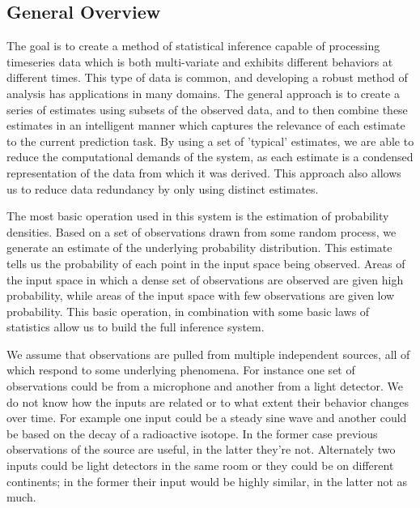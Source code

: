 \documentclass[10pt]{article}
\begin{document}



\subsection{General Overview}
The goal is to create a method of statistical inference capable of processing timeseries data which is both multi-variate and exhibits different behaviors at different times.  This type of data is common, and developing a robust method of analysis has applications in many domains.  The general approach is to create a series of estimates using subsets of the observed data, and to then combine these estimates in an intelligent manner which captures the relevance of each estimate to the current prediction task.  By using a set of 'typical' estimates, we are able to reduce the computational demands of the system, as each estimate is a condensed representation of the data from which it was derived.  This approach also allows us to reduce data redundancy by only using distinct estimates.

The most basic operation used in this system is the estimation of probability densities.  Based on a set of observations drawn from some random process, we generate an estimate of the underlying probability distribution.  This estimate tells us the probability of each point in the input space being observed.  Areas of the input space in which a dense set of observations are observed are given high probability, while areas of the input space with few observations are given low probability.  This basic operation, in combination with some basic laws of statistics allow us to build the full inference system.

We assume that observations are pulled from multiple independent sources, all of which respond to some underlying phenomena.  For instance one set of observations could be from a microphone and another from a light detector.  We do not know how the inputs are related or to what extent their behavior changes over time.  For example one input could be a steady sine wave and another could be based on the decay of a radioactive isotope.  In the former case previous observations of the source are useful, in the latter they're not.  Alternately two inputs could be light detectors in the same room or they could be on different continents; in the former their input would be highly similar, in the latter not as much.
\end{document}
